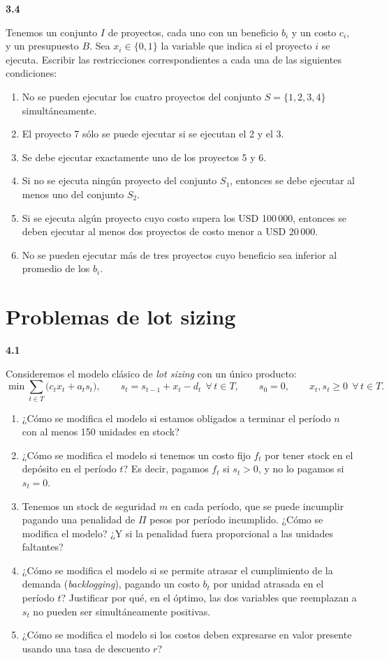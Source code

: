 \documentclass[11pt,a4paper]{article}
\newcommand{\ejercicio}[1]{\par\medskip\noindent\textbf{#1}\par\nopagebreak\smallskip}
\begin{document}
\ejercicio{3.4}
Tenemos un conjunto $I$ de proyectos, cada uno con un beneficio $b_i$ y un costo
$c_i$, y un presupuesto $B$. Sea $x_i \in \{0,1\}$ la variable que indica si el
proyecto $i$ se ejecuta. Escribir las restricciones correspondientes a cada una
de las siguientes condiciones:
\begin{enumerate}[itemsep=1pt]
  \item No se pueden ejecutar los cuatro proyectos del conjunto
  $S = \{1,2,3,4\}$ simultáneamente.
  \item El proyecto 7 sólo se puede ejecutar si se ejecutan el 2 y el 3.
  \item Se debe ejecutar exactamente uno de los proyectos 5 y 6.
  \item Si no se ejecuta ningún proyecto del conjunto $S_1$, entonces se debe
  ejecutar al menos uno del conjunto $S_2$.
  \item Si se ejecuta algún proyecto cuyo costo supera los USD 100\,000,
  entonces se deben ejecutar al menos dos proyectos de costo menor a USD
  20\,000.
  \item No se pueden ejecutar más de tres proyectos cuyo beneficio sea inferior
  al promedio de los $b_i$.
\end{enumerate}

\section{Problemas de lot sizing}

\ejercicio{4.1}
Consideremos el modelo clásico de \emph{lot sizing} con un único producto:
\[
\min \sum_{t \in T} \big( c_t x_t + a_t s_t \big), \qquad
s_t = s_{t-1} + x_t - d_t \ \ \forall\, t \in T, \qquad
s_0 = 0, \qquad x_t, s_t \ge 0 \ \ \forall\, t \in T .
\]
\begin{enumerate}
  \item ¿Cómo se modifica el modelo si estamos obligados a terminar el período
  $n$ con al menos 150 unidades en stock?
  \item ¿Cómo se modifica el modelo si tenemos un costo fijo $f_t$ por tener
  stock en el depósito en el período $t$? Es decir, pagamos $f_t$ si $s_t > 0$,
  y no lo pagamos si $s_t = 0$.
  \item Tenemos un stock de seguridad $m$ en cada período, que se puede
  incumplir pagando una penalidad de $\Pi$ pesos por período incumplido.
  ¿Cómo se modifica el modelo? ¿Y si la penalidad fuera proporcional a las
  unidades faltantes?
  \item ¿Cómo se modifica el modelo si se permite atrasar el cumplimiento de la
  demanda (\emph{backlogging}), pagando un costo $b_t$ por unidad atrasada en el
  período $t$? Justificar por qué, en el óptimo, las dos variables que
  reemplazan a $s_t$ no pueden ser simultáneamente positivas.
  \item ¿Cómo se modifica el modelo si los costos deben expresarse en valor
  presente usando una tasa de descuento $r$?
\end{enumerate}
\end{document}
